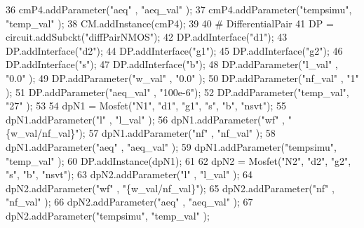 \begin{DoxyCodeInclude}
36 cmP4.addParameter(\textcolor{stringliteral}{"aeq"}     , \textcolor{stringliteral}{"aeq\_val"}       );
37 cmP4.addParameter(\textcolor{stringliteral}{"tempsimu"}, \textcolor{stringliteral}{"temp\_val"}      );
38 CM.addInstance(cmP4);
39 
40 \textcolor{comment}{# DifferentialPair}
41 DP = circuit.addSubckt(\textcolor{stringliteral}{"diffPairNMOS"});
42 DP.addInterface(\textcolor{stringliteral}{"d1"});
43 DP.addInterface(\textcolor{stringliteral}{"d2"});
44 DP.addInterface(\textcolor{stringliteral}{"g1"});
45 DP.addInterface(\textcolor{stringliteral}{"g2"});
46 DP.addInterface(\textcolor{stringliteral}{"s"});
47 DP.addInterface(\textcolor{stringliteral}{"b"});
48 DP.addParameter(\textcolor{stringliteral}{"l\_val"}   , \textcolor{stringliteral}{"0.0"}   );
49 DP.addParameter(\textcolor{stringliteral}{"w\_val"}   , \textcolor{stringliteral}{"0.0"}   );
50 DP.addParameter(\textcolor{stringliteral}{"nf\_val"}  , \textcolor{stringliteral}{"1"}     );
51 DP.addParameter(\textcolor{stringliteral}{"aeq\_val"} , \textcolor{stringliteral}{"100e-6"});
52 DP.addParameter(\textcolor{stringliteral}{"temp\_val"}, \textcolor{stringliteral}{"27"}    );
53 
54 dpN1 = Mosfet(\textcolor{stringliteral}{"N1"}, \textcolor{stringliteral}{"d1"}, \textcolor{stringliteral}{"g1"}, \textcolor{stringliteral}{"s"}, \textcolor{stringliteral}{"b"}, \textcolor{stringliteral}{"nsvt"});
55 dpN1.addParameter(\textcolor{stringliteral}{"l"}       , \textcolor{stringliteral}{"l\_val"}         );
56 dpN1.addParameter(\textcolor{stringliteral}{"wf"}      , \textcolor{stringliteral}{"\{w\_val/nf\_val\}"});
57 dpN1.addParameter(\textcolor{stringliteral}{"nf"}      , \textcolor{stringliteral}{"nf\_val"}        );
58 dpN1.addParameter(\textcolor{stringliteral}{"aeq"}     , \textcolor{stringliteral}{"aeq\_val"}       );
59 dpN1.addParameter(\textcolor{stringliteral}{"tempsimu"}, \textcolor{stringliteral}{"temp\_val"}      );
60 DP.addInstance(dpN1);
61 
62 dpN2 = Mosfet(\textcolor{stringliteral}{"N2"}, \textcolor{stringliteral}{"d2"}, \textcolor{stringliteral}{"g2"}, \textcolor{stringliteral}{"s"}, \textcolor{stringliteral}{"b"}, \textcolor{stringliteral}{"nsvt"});
63 dpN2.addParameter(\textcolor{stringliteral}{"l"}       , \textcolor{stringliteral}{"l\_val"}         );
64 dpN2.addParameter(\textcolor{stringliteral}{"wf"}      , \textcolor{stringliteral}{"\{w\_val/nf\_val\}"});
65 dpN2.addParameter(\textcolor{stringliteral}{"nf"}      , \textcolor{stringliteral}{"nf\_val"}        );
66 dpN2.addParameter(\textcolor{stringliteral}{"aeq"}     , \textcolor{stringliteral}{"aeq\_val"}       );
67 dpN2.addParameter(\textcolor{stringliteral}{"tempsimu"}, \textcolor{stringliteral}{"temp\_val"}      );

\end{DoxyCodeInclude}
